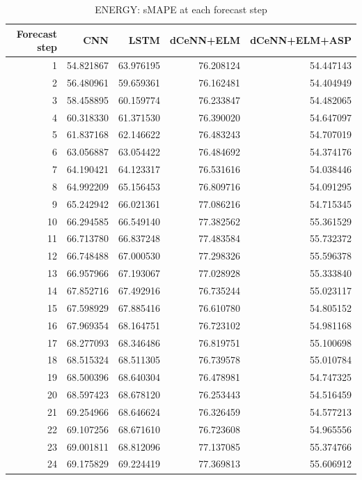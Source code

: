 \begin{table}
\caption{ENERGY: sMAPE at each forecast step}
\begin{tabular}{rrrrr}
\toprule
Forecast step & CNN & LSTM & dCeNN+ELM & dCeNN+ELM+ASP \\
\midrule
1 & 54.821867 & 63.976195 & 76.208124 & 54.447143 \\
2 & 56.480961 & 59.659361 & 76.162481 & 54.404949 \\
3 & 58.458895 & 60.159774 & 76.233847 & 54.482065 \\
4 & 60.318330 & 61.371530 & 76.390020 & 54.647097 \\
5 & 61.837168 & 62.146622 & 76.483243 & 54.707019 \\
6 & 63.056887 & 63.054422 & 76.484692 & 54.374176 \\
7 & 64.190421 & 64.123317 & 76.531616 & 54.038446 \\
8 & 64.992209 & 65.156453 & 76.809716 & 54.091295 \\
9 & 65.242942 & 66.021361 & 77.086216 & 54.715345 \\
10 & 66.294585 & 66.549140 & 77.382562 & 55.361529 \\
11 & 66.713780 & 66.837248 & 77.483584 & 55.732372 \\
12 & 66.748488 & 67.000530 & 77.298326 & 55.596378 \\
13 & 66.957966 & 67.193067 & 77.028928 & 55.333840 \\
14 & 67.852716 & 67.492916 & 76.735244 & 55.023117 \\
15 & 67.598929 & 67.885416 & 76.610780 & 54.805152 \\
16 & 67.969354 & 68.164751 & 76.723102 & 54.981168 \\
17 & 68.277093 & 68.346486 & 76.819751 & 55.100698 \\
18 & 68.515324 & 68.511305 & 76.739578 & 55.010784 \\
19 & 68.500396 & 68.640304 & 76.478981 & 54.747325 \\
20 & 68.597423 & 68.678120 & 76.253443 & 54.516459 \\
21 & 69.254966 & 68.646624 & 76.326459 & 54.577213 \\
22 & 69.107256 & 68.671610 & 76.723608 & 54.965556 \\
23 & 69.001811 & 68.812096 & 77.137085 & 55.374766 \\
24 & 69.175829 & 69.224419 & 77.369813 & 55.606912 \\
\bottomrule
\end{tabular}
\end{table}
